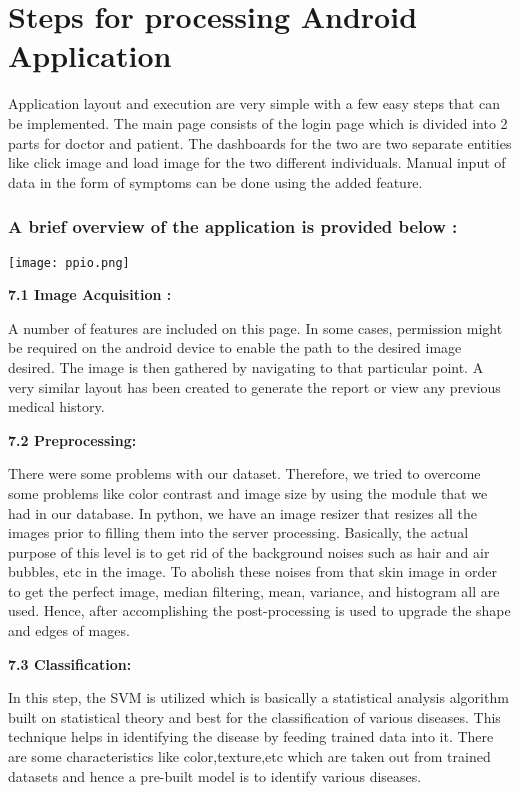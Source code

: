 \documentclass{article}
\begin{document}
\section{Steps for processing Android Application}

Application layout and execution are very simple with a few easy steps that can be implemented.
The main page consists of the login page which is divided into 2 parts for doctor and patient. The dashboards for the two are two separate entities like click image and load image for the two different individuals. Manual input of data in the form of symptoms can be done using the added feature.

\subsubsection{A brief overview of the application is provided below :}

\begin{center}
    \texttt{[image: ppio.png]}
\end{center}
\textbf{7.1 Image Acquisition :}

A number of features are included on this page. In some cases, permission might be required on the android device to enable the path to the desired image desired.
The image is then gathered by navigating to that particular point. A very similar layout has been created to generate the report or view any previous medical history.

\textbf{7.2 Preprocessing:}


There were some problems with our dataset. Therefore, we tried to overcome some problems like color contrast and image size by using the module that we had in our database.
In python, we have an image resizer that resizes all the images prior to filling them into the server processing. Basically, the actual purpose of this level is to get rid of the background noises such as hair and air bubbles, etc in the image. To abolish these noises from that skin image in order to get the perfect image, median filtering, mean, variance, and histogram all are used. Hence, after accomplishing the post-processing is used to upgrade the shape and edges of mages.

\textbf{7.3 Classification:}

In this step, the SVM is utilized which is basically a statistical analysis algorithm built on statistical theory and best for the classification of various diseases. This technique helps in identifying the disease by feeding trained data into it. There are some characteristics like color,texture,etc which are taken out from trained datasets and hence a pre-built model is to identify various diseases.
\end{document}

